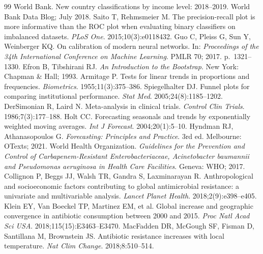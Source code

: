 \documentclass[11pt,a4paper]{article}
\begin{document}
\begin{thebibliography}{99}
 World Bank. New country classifications by income level: 2018--2019. World Bank Data Blog; July 2018.
 Saito T, Rehmsmeier M. The precision-recall plot is more informative than the ROC plot when evaluating binary classifiers on imbalanced datasets. \textit{PLoS One}. 2015;10(3):e0118432.
 Guo C, Pleiss G, Sun Y, Weinberger KQ. On calibration of modern neural networks. In: \textit{Proceedings of the 34th International Conference on Machine Learning}. PMLR 70; 2017. p.~1321--1330.
 Efron B, Tibshirani RJ. \textit{An Introduction to the Bootstrap}. New York: Chapman \& Hall; 1993.
 Armitage P. Tests for linear trends in proportions and frequencies. \textit{Biometrics}. 1955;11(3):375--386.
 Spiegelhalter DJ. Funnel plots for comparing institutional performance. \textit{Stat Med}. 2005;24(8):1185--1202.
 DerSimonian R, Laird N. Meta-analysis in clinical trials. \textit{Control Clin Trials}. 1986;7(3):177--188.
 Holt CC. Forecasting seasonals and trends by exponentially weighted moving averages. \textit{Int J Forecast}. 2004;20(1):5--10.
 Hyndman RJ, Athanasopoulos G. \textit{Forecasting: Principles and Practice}. 3rd ed. Melbourne: OTexts; 2021.
 World Health Organization. \textit{Guidelines for the Prevention and Control of Carbapenem-Resistant Enterobacteriaceae, Acinetobacter baumannii and Pseudomonas aeruginosa in Health Care Facilities}. Geneva: WHO; 2017.
 Collignon P, Beggs JJ, Walsh TR, Gandra S, Laxminarayan R. Anthropological and socioeconomic factors contributing to global antimicrobial resistance: a univariate and multivariable analysis. \textit{Lancet Planet Health}. 2018;2(9):e398--e405.
 Klein EY, Van Boeckel TP, Martinez EM, et al. Global increase and geographic convergence in antibiotic consumption between 2000 and 2015. \textit{Proc Natl Acad Sci USA}. 2018;115(15):E3463--E3470.
 MacFadden DR, McGough SF, Fisman D, Santillana M, Brownstein JS. Antibiotic resistance increases with local temperature. \textit{Nat Clim Change}. 2018;8:510--514.
\end{thebibliography}

\clearpage
\appendix
\end{document}
